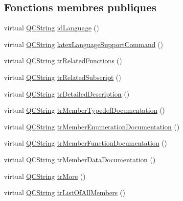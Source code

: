 \subsection*{Fonctions membres publiques}
\begin{DoxyCompactItemize}
\item 
virtual \hyperlink{class_q_c_string}{Q\+C\+String} \hyperlink{class_translator_chinesetraditional_a9bc148d1e1b9c00b90e35b935e3bd069}{id\+Language} ()
\item 
virtual \hyperlink{class_q_c_string}{Q\+C\+String} \hyperlink{class_translator_chinesetraditional_a61b66ec8d48398beab664080f41f30b0}{latex\+Language\+Support\+Command} ()
\item 
virtual \hyperlink{class_q_c_string}{Q\+C\+String} \hyperlink{class_translator_chinesetraditional_aca72bb636f7b1d0f89ef3bf76a0ac3a0}{tr\+Related\+Functions} ()
\item 
virtual \hyperlink{class_q_c_string}{Q\+C\+String} \hyperlink{class_translator_chinesetraditional_a1e290a366815e1a6f81ab8f7ecb0e860}{tr\+Related\+Subscript} ()
\item 
virtual \hyperlink{class_q_c_string}{Q\+C\+String} \hyperlink{class_translator_chinesetraditional_ae444fc9b33fcfbf93481265d27ed7721}{tr\+Detailed\+Description} ()
\item 
virtual \hyperlink{class_q_c_string}{Q\+C\+String} \hyperlink{class_translator_chinesetraditional_a61aa7fe0392853be8c7db7243aa854de}{tr\+Member\+Typedef\+Documentation} ()
\item 
virtual \hyperlink{class_q_c_string}{Q\+C\+String} \hyperlink{class_translator_chinesetraditional_ac3b40e07275582cfee780a2d5b448e37}{tr\+Member\+Enumeration\+Documentation} ()
\item 
virtual \hyperlink{class_q_c_string}{Q\+C\+String} \hyperlink{class_translator_chinesetraditional_a777b4cf186ed3ac42c624183568fd61b}{tr\+Member\+Function\+Documentation} ()
\item 
virtual \hyperlink{class_q_c_string}{Q\+C\+String} \hyperlink{class_translator_chinesetraditional_a61381745fb939687e8a569ec137cc60c}{tr\+Member\+Data\+Documentation} ()
\item 
virtual \hyperlink{class_q_c_string}{Q\+C\+String} \hyperlink{class_translator_chinesetraditional_ad91d5ea9f31d47efac43960215ce6179}{tr\+More} ()
\item 
virtual \hyperlink{class_q_c_string}{Q\+C\+String} \hyperlink{class_translator_chinesetraditional_a2cf1edd61c495a0858c2a40a97a8212a}{tr\+List\+Of\+All\+Members} ()
\item 

\end{DoxyCompactItemize}

